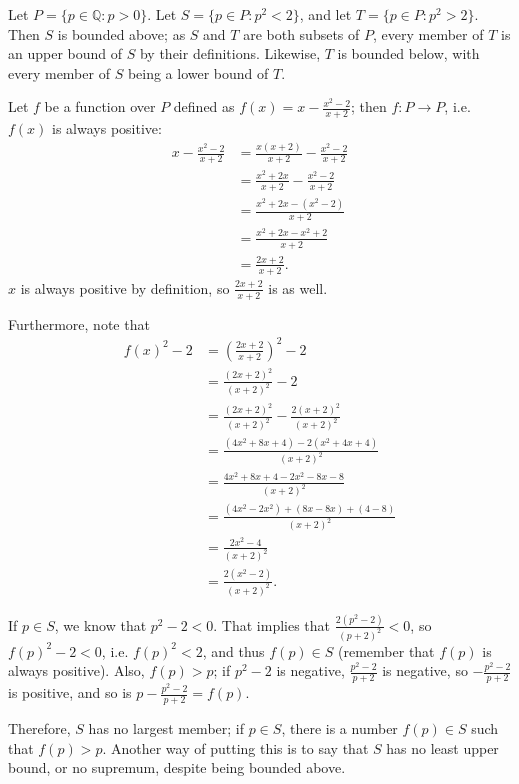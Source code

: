 \documentclass[12pt]{article}
\begin{document}
\begin{exm}
  Let $P = \{p \in \mathbb{Q}: p > 0\}$. Let $S = \{p \in P: p^2 < 2\}$, and let $T =
  \{p \in P: p^2 > 2\}$. Then $S$ is bounded above; as $S$ and $T$ are both subsets
  of $P$, every member of $T$ is an upper bound of $S$ by their definitions.
  Likewise, $T$ is bounded below, with every member of $S$ being a lower bound of
  $T$.

  Let $f$ be a function over $P$ defined as $f(x) = x - \frac{x^2 - 2}{x + 2}$; then
  $f: P \to P$, i.e. $f(x)$ is always
  positive:
  \begin{align*}
    x - \frac{x^2 - 2}{x + 2} &= \frac{x(x +2)}{x + 2} - \frac{x^2 - 2}{x + 2}\\
    &= \frac{x^2 + 2x}{x + 2} - \frac{x^2 - 2}{x + 2}\\
    &= \frac{x^2 + 2x - (x^2 - 2)}{x + 2}\\
    &= \frac{x^2 + 2x - x^2 + 2}{x + 2}\\
    &= \frac{2x + 2}{x + 2}.
  \end{align*}
  $x$ is always positive by definition, so $\frac{2x + 2}{x + 2}$ is as well.

  Furthermore, note that
  \begin{align*}
    f(x)^2 - 2 &= \left(\frac{2x + 2}{x + 2}\right)^2 - 2\\
    &= \frac{(2x + 2)^2}{(x + 2)^2} - 2\\
    &= \frac{(2x + 2)^2}{(x + 2)^2} - \frac{2(x + 2)^2}{(x + 2)^2}\\
    &= \frac{(4x^2 + 8x + 4) - 2(x^2 + 4x + 4)}{(x + 2)^2}\\
    &= \frac{4x^2 + 8x + 4 - 2x^2 - 8x - 8}{(x + 2)^2}\\
    &= \frac{(4x^2 - 2x^2) + (8x - 8x) + (4 - 8)}{(x + 2)^2}\\
    &= \frac{2x^2 - 4}{(x + 2)^2}\\
    &= \frac{2(x^2 - 2)}{(x + 2)^2}.
  \end{align*}

  If $p \in S$, we know that $p^2 - 2 < 0$. That implies that $\frac{2(p^2 - 2)}{(p +
  2)^2} < 0$, so $f(p)^2 - 2 < 0$, i.e. $f(p)^2 < 2$, and thus $f(p) \in S$ (remember
  that $f(p)$ is always positive). Also, $f(p) > p$; if $p^2 - 2$ is negative,
  $\frac{p^2 - 2}{p + 2}$ is negative, so $-\frac{p^2 - 2}{p + 2}$ is positive, and
  so is $p - \frac{p^2 - 2}{p + 2} = f(p)$.

  Therefore, $S$ has no largest member; if $p \in S$, there is a number $f(p) \in S$
  such that $f(p) > p$. Another way of putting this is to say that $S$ has no least
  upper bound, or no supremum, despite being bounded above.


\end{exm}
\end{document}
